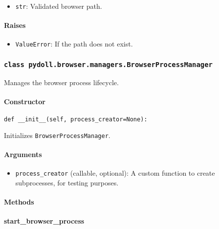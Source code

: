 \documentclass{article}
\begin{document}
\begin{itemize}
    \item \lstinline[style=pythonstyle]|str|: Validated browser path.
\end{itemize}

\paragraph{Raises}

\begin{itemize}
    \item \lstinline[style=pythonstyle]|ValueError|: If the path does not exist.
\end{itemize}

\subsubsection*{\texttt{class pydoll.browser.managers.BrowserProcessManager}}
\noindent Manages the browser process lifecycle.

\paragraph{Constructor}

\begin{lstlisting}[style=pythonstyle]
def __init__(self, process_creator=None):
\end{lstlisting}

\noindent Initializes \lstinline[style=pythonstyle]|BrowserProcessManager|.

\paragraph{Arguments}

\begin{itemize}
    \item \lstinline[style=pythonstyle]|process_creator| (callable, optional): A custom function to create subprocesses, for testing purposes.
\end{itemize}

\paragraph{Methods}
\paragraph{start\_browser\_process}
\end{document}
